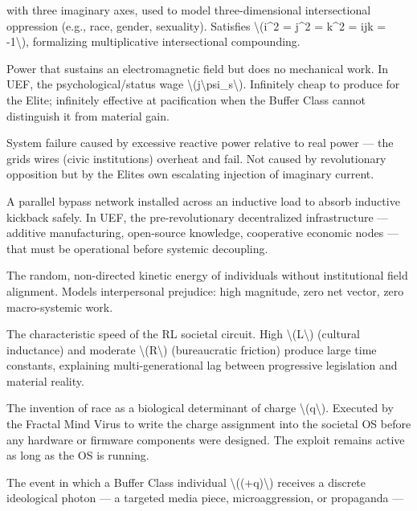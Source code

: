 {\begin{description}
with three imaginary axes, used to model three-dimensional
intersectional oppression (e.g., race, gender, sexuality). Satisfies
\textbackslash(i\^{}2 = j\^{}2 = k\^{}2 = ijk = -1\textbackslash),
formalizing multiplicative intersectional compounding.
\item[Reactive Power]
Power that sustains an electromagnetic field but does no mechanical
work. In UEF, the psychological/status wage
\textbackslash(j\textbackslash psi\_s\textbackslash). Infinitely cheap
to produce for the Elite; infinitely effective at pacification when the
Buffer Class cannot distinguish it from material gain.
\item[Societal Voltage Collapse]
System failure caused by excessive reactive power relative to real power
--- the grid\textquotesingle s wires (civic institutions) overheat and
fail. Not caused by revolutionary opposition but by the
Elite\textquotesingle s own escalating injection of imaginary current.
\item[Snubber Circuit]
A parallel bypass network installed across an inductive load to absorb
inductive kickback safely. In UEF, the pre-revolutionary decentralized
infrastructure --- additive manufacturing, open-source knowledge,
cooperative economic nodes --- that must be operational before systemic
decoupling.
\item[Thermal Velocity \textbackslash(v\_\{th\}\textbackslash)]
The random, non-directed kinetic energy of individuals without
institutional field alignment. Models interpersonal prejudice: high
magnitude, zero net vector, zero macro-systemic work.
\item[Time Constant \textbackslash(\textbackslash tau\_\{circuit\} =
L/R\textbackslash)]
The characteristic speed of the RL societal circuit. High
\textbackslash(L\textbackslash) (cultural inductance) and moderate
\textbackslash(R\textbackslash) (bureaucratic friction) produce large
time constants, explaining multi-generational lag between progressive
legislation and material reality.
\item[Zero-Day Exploit]
The invention of race as a biological determinant of charge
\textbackslash(q\textbackslash). Executed by the Fractal Mind Virus to
write the charge assignment into the societal OS before any hardware or
firmware components were designed. The exploit remains active as long as
the OS is running.
\item[Absorption (Quantum)]
The event in which a Buffer Class individual
\textbackslash((+q)\textbackslash) receives a discrete ideological
photon --- a targeted media piece, microaggression, or propaganda ---

\end{description}}
